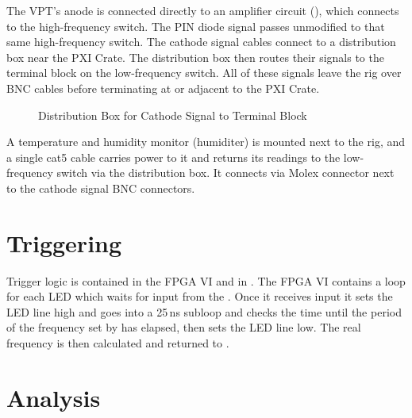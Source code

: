 
The VPT's anode is connected directly to an amplifier circuit (), which connects to the  high-frequency switch.  The PIN diode signal passes unmodified to that same  high-frequency switch.  The cathode signal cables connect to a distribution box near the PXI Crate.  The distribution box then routes their signals to the terminal block on the  low-frequency switch.  All of these signals leave the rig over \gls{BNC} cables before terminating at or adjacent to the PXI Crate.

\begin{figure}[htbp]
  \centering
  \caption{Distribution Box for Cathode Signal to Terminal Block}
  \label{fig:eq_intro:distribution_box}
\end{figure}

A temperature and humidity monitor (\gls{humiditer}) is mounted next to the rig, and a single cat5 cable carries power to it and returns its readings to the  low-frequency switch via the distribution box. It connects via \Gls{Molex} connector next to the cathode signal \gls{BNC} connectors.

\section{Triggering}

Trigger logic is contained in the FPGA VI and in .  The FPGA VI contains a loop for each LED which waits for input from the .  Once it receives input it sets the LED line high and goes into a 25\,ns subloop and checks the time until the period of the frequency set by  has elapsed, then sets the LED line low.  The real frequency is then calculated and returned to .

\section{Analysis}

